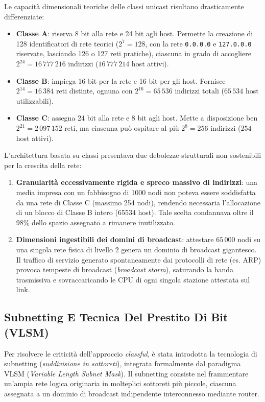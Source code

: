 \documentclass[11pt, a4paper]{article}
\begin{document}
Le capacità dimensionali teoriche delle classi unicast risultano drasticamente differenziate:
\begin{itemize}
    \item \textbf{Classe A}: riserva 8 bit alla rete e 24 bit agli host. Permette la creazione di 128 identificatori di rete teorici ($2^7 = 128$, con la rete \texttt{0.0.0.0} e \texttt{127.0.0.0} riservate, lasciando 126 o 127 reti pratiche), ciascuna in grado di accogliere $2^{24} = 16\,777\,216$ indirizzi ($16\,777\,214$ host attivi).
    \item \textbf{Classe B}: impiega 16 bit per la rete e 16 bit per gli host. Fornisce $2^{14} = 16\,384$ reti distinte, ognuna con $2^{16} = 65\,536$ indirizzi totali ($65\,534$ host utilizzabili).
    \item \textbf{Classe C}: assegna 24 bit alla rete e 8 bit agli host. Mette a disposizione ben $2^{21} = 2\,097\,152$ reti, ma ciascuna può ospitare al più $2^8 = 256$ indirizzi ($254$ host attivi).
\end{itemize}

L'architettura basata su classi presentava due debolezze strutturali non sostenibili per la crescita della rete:
\begin{enumerate}
    \item \textbf{Granularità eccessivamente rigida e spreco massivo di indirizzi}: una media impresa con un fabbisogno di 1000 nodi non poteva essere soddisfatta da una rete di Classe C (massimo 254 nodi), rendendo necessaria l'allocazione di un blocco di Classe B intero (65534 host). Tale scelta condannava oltre il 98\% dello spazio assegnato a rimanere inutilizzato.
    \item \textbf{Dimensioni ingestibili dei domini di broadcast}: attestare $65\,000$ nodi su una singola rete fisica di livello 2 genera un dominio di broadcast gigantesco. Il traffico di servizio generato spontaneamente dai protocolli di rete (es. ARP) provoca tempeste di broadcast (\emph{broadcast storm}), saturando la banda trasmissiva e sovraccaricando le CPU di ogni singola stazione attestata sul link.
\end{enumerate}

\subsection{Subnetting E Tecnica Del Prestito Di Bit (VLSM)}
Per risolvere le criticità dell'approccio \emph{classful}, è stata introdotta la tecnologia di subnetting (\emph{suddivisione in sottoreti}), integrata formalmente dal paradigma VLSM (\emph{Variable Length Subnet Mask}). Il subnetting consiste nel frammentare un'ampia rete logica originaria in molteplici sottoreti più piccole, ciascuna assegnata a un dominio di broadcast indipendente interconnesso mediante router.
\end{document}
